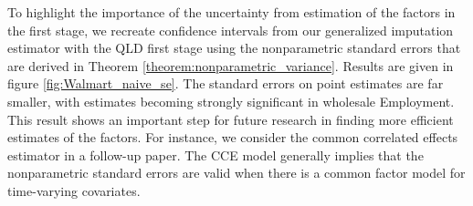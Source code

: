 % 
% 
% 

To highlight the importance of the uncertainty from estimation of the factors in the first stage, we recreate confidence intervals from our generalized imputation estimator with the QLD first stage using the nonparametric standard errors that are derived in Theorem \ref{theorem:nonparametric_variance}. Results are given in figure \ref{fig:Walmart_naive_se}. The standard errors on point estimates are far smaller, with estimates becoming strongly significant in wholesale Employment. This result shows an important step for future research in finding more efficient estimates of the factors. For instance, we consider the common correlated effects estimator in a follow-up paper. The CCE model generally implies that the nonparametric standard errors are valid when there is a common factor model for time-varying covariates.

